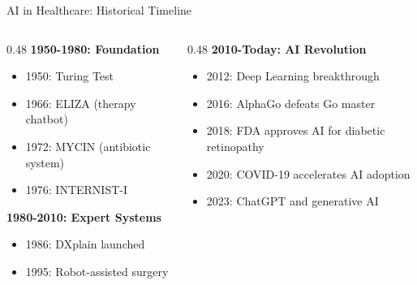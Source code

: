 \documentclass[aspectratio=169, 10pt]{beamer}
\begin{document}
\begin{frame}{AI in Healthcare: Historical Timeline}

    \begin{columns}
        \begin{column}{0.48\textwidth}
            \textbf{1950-1980: Foundation}
            \begin{itemize}
                \item 1950: Turing Test
                \item 1966: ELIZA (therapy chatbot)
                \item 1972: MYCIN (antibiotic system)
                \item 1976: INTERNIST-I
            \end{itemize}

            \vspace{2mm}
            \textbf{1980-2010: Expert Systems}
            \begin{itemize}
                \item 1986: DXplain launched
                \item 1995: Robot-assisted surgery
            \end{itemize}
        \end{column}

        \begin{column}{0.48\textwidth}
            \textbf{2010-Today: AI Revolution}
            \begin{itemize}
                \item 2012: Deep Learning breakthrough
                \item 2016: AlphaGo defeats Go master
                \item 2018: FDA approves AI for diabetic retinopathy
                \item 2020: COVID-19 accelerates AI adoption
                \item 2023: ChatGPT and generative AI
            \end{itemize}
        \end{column}
    \end{columns}

    \vspace{3mm}
    \begin{center}
\end{center}
\end{frame}
\end{document}
